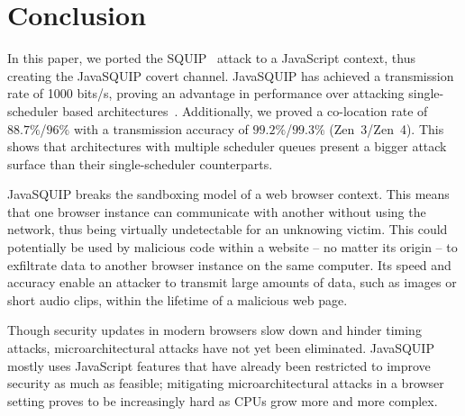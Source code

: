 \documentclass[11pt,
  titlepage=false,
]{scrreprt}
\begin{document}

\chapter{Conclusion}
\label{ch:conclusion}
In this paper, we ported the SQUIP~\cite{squip} attack to a JavaScript context, thus creating the JavaSQUIP covert channel.
JavaSQUIP has achieved a transmission rate of 1000 bits/s, proving an advantage in performance over attacking single-scheduler based architectures~\cite{Rokicki2022webport}.
Additionally, we proved a co-location rate of $88.7\%$/$96\%$ with a transmission accuracy of $99.2\%$/$99.3\%$ (Zen~3/Zen~4).
This shows that architectures with multiple scheduler queues present a bigger attack surface than their single-scheduler counterparts.

JavaSQUIP breaks the sandboxing model of a web browser context.
This means that one browser instance can communicate with another without using the network, thus being virtually undetectable for an unknowing victim.
This could potentially be used by malicious code within a website -- no matter its origin -- to exfiltrate data to another browser instance on the same computer.
Its speed and accuracy enable an attacker to transmit large amounts of data, such as images or short audio clips, within the lifetime of a malicious web page.

Though security updates in modern browsers slow down and hinder timing attacks, microarchitectural attacks have not yet been eliminated.
JavaSQUIP mostly uses JavaScript features that have already been restricted to improve security as much as feasible;
mitigating microarchitectural attacks in a browser setting proves to be increasingly hard as CPUs grow more and more complex.



\printbibliography
\end{document}

